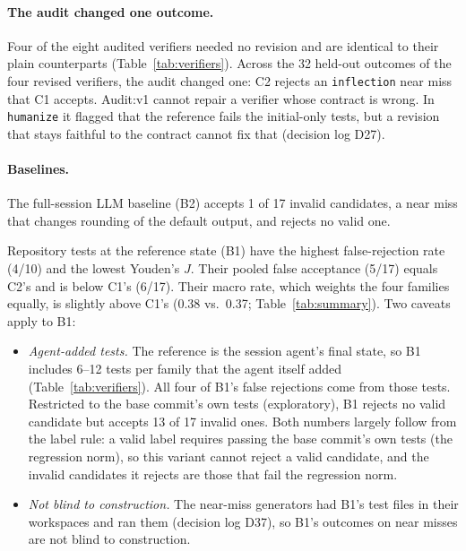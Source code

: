 \paragraph{The audit changed one outcome.} Four of the eight audited verifiers needed no revision and are identical to their plain counterparts (Table~\ref{tab:verifiers}). Across the 32 held-out outcomes of the four revised verifiers, the audit changed one: C2 rejects an \texttt{inflection} near miss that C1 accepts. Audit:v1 cannot repair a verifier whose contract is wrong. In \texttt{humanize} it flagged that the reference fails the initial-only tests, but a revision that stays faithful to the contract cannot fix that (decision log D27).

\paragraph{Baselines.} The full-session LLM baseline (B2) accepts 1 of 17 invalid candidates, a near miss that changes rounding of the default output, and rejects no valid one.

Repository tests at the reference state (B1) have the highest false-rejection rate (4/10) and the lowest Youden's $J$. Their pooled false acceptance (5/17) equals C2's and is below C1's (6/17). Their macro rate, which weights the four families equally, is slightly above C1's (0.38 vs.\ 0.37; Table~\ref{tab:summary}). Two caveats apply to B1:
\begin{itemize}
\item \emph{Agent-added tests.} The reference is the session agent's final state, so B1 includes 6--12 tests per family that the agent itself added (Table~\ref{tab:verifiers}). All four of B1's false rejections come from those tests. Restricted to the base commit's own tests (exploratory), B1 rejects no valid candidate but accepts 13 of 17 invalid ones. Both numbers largely follow from the label rule: a valid label requires passing the base commit's own tests (the regression norm), so this variant cannot reject a valid candidate, and the invalid candidates it rejects are those that fail the regression norm.
\item \emph{Not blind to construction.} The near-miss generators had B1's test files in their workspaces and ran them (decision log D37), so B1's outcomes on near misses are not blind to construction.
\end{itemize}

